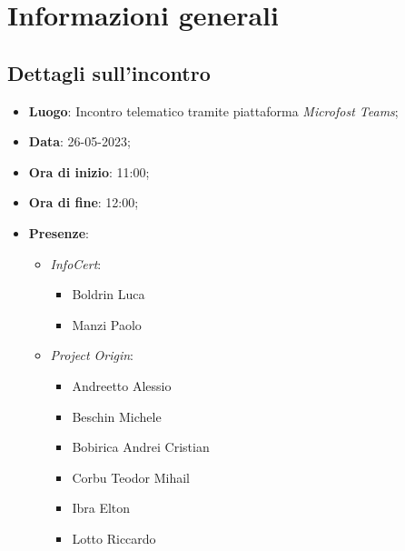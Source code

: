 \section{Informazioni generali}

\subsection{Dettagli sull'incontro}
\begin{itemize}
\item \textbf{Luogo}: Incontro telematico tramite piattaforma \textit{Microfost Teams\glo};
\item \textbf{Data}: 26-05-2023;
\item \textbf{Ora di inizio}: 11:00;
\item \textbf{Ora di fine}: 12:00;
\item \textbf{Presenze}: 
\begin{itemize}
    \item \textit{InfoCert}: \begin{itemize}
            \item Boldrin Luca 
            \item Manzi Paolo 
        \end{itemize}  
    \item \textit{Project Origin}:  \begin{itemize}
        \item Andreetto Alessio
        \item Beschin Michele
        \item Bobirica Andrei Cristian
        \item Corbu Teodor Mihail
        \item Ibra Elton
        \item Lotto Riccardo 
    \end{itemize}	
\end{itemize}
\end{itemize}



